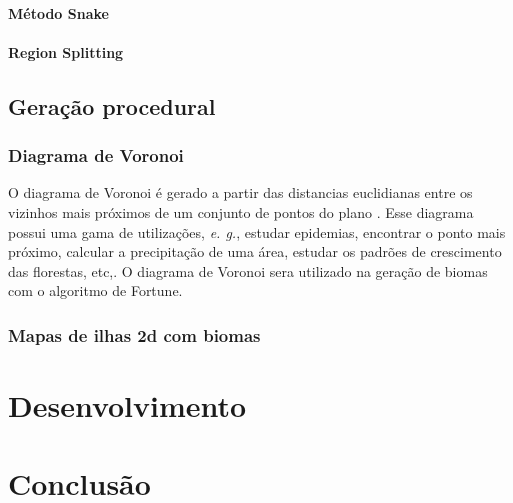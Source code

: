 \documentclass[
	12pt,				%
	openright,			%
	twoside,			%
	a4paper,			%
	english,			%
	french,				%
	spanish,			%
	brazil				%
	]{abntex2}
\begin{document}
\subsubsection{Método Snake}
\subsubsection{ Region Splitting}


\section{Geração procedural}
\subsection{Diagrama de Voronoi}

O diagrama de Voronoi é gerado a partir das distancias euclidianas entre os vizinhos mais próximos de um conjunto de pontos do plano\space
\cite{diagrama_de_voronoi:_uma_exploracao_nas_distancias_euclidiana_e_do_taxi}. Esse diagrama possui uma gama de utilizações, \emph{e. g.}, estudar epidemias, encontrar o 
ponto mais próximo, calcular a precipitação de uma área, estudar os padrões de crescimento das florestas, etc,\space\cite{poligonos_de_thiessen_ou_voronoi}. O diagrama de 
Voronoi sera utilizado na geração de biomas com o algoritmo de Fortune.


\subsection{Mapas de ilhas 2d com biomas}

\chapter{Desenvolvimento}


\chapter*[Conclusão]{Conclusão}

\lipsum[31-33]
\end{document}
